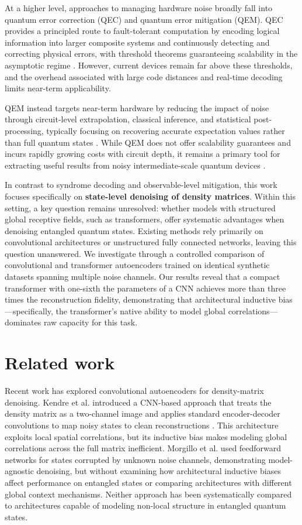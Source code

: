 \documentclass[a4paper, 11pt, colorlinks=true, citecolor=., linkcolor=black, urlcolor=black]{article}
\begin{document}
At a higher level, approaches to managing hardware noise broadly fall into quantum error correction (QEC) and quantum error mitigation (QEM). QEC provides a principled route to fault-tolerant computation by encoding logical information into larger composite systems and continuously detecting and correcting physical errors, with threshold theorems guaranteeing scalability in the asymptotic regime \autocites{Bravyi_2024}[][]{202509.2149}. However, current devices remain far above these thresholds, and the overhead associated with large code distances and real-time decoding limits near-term applicability.

QEM instead targets near-term hardware by reducing the impact of noise through circuit-level extrapolation, classical inference, and statistical post-processing, typically focusing on recovering accurate expectation values rather than full quantum states \autocites{RevModPhys.95.045005}[][]{Bultrini_2023}. While QEM does not offer scalability guarantees and incurs rapidly growing costs with circuit depth, it remains a primary tool for extracting useful results from noisy intermediate-scale quantum devices \autocite{filippov2024scalabilityquantumerrormitigation}.

In contrast to syndrome decoding and observable-level mitigation, this work focuses specifically on \textbf{state-level denoising of density matrices}. Within this setting, a key question remains unresolved: whether models with structured global receptive fields, such as transformers, offer systematic advantages when denoising entangled quantum states. Existing methods rely primarily on convolutional architectures or unstructured fully connected networks, leaving this question unanswered. We investigate through a controlled comparison of convolutional and transformer autoencoders trained on identical synthetic datasets spanning multiple noise channels. Our results reveal that a compact transformer with one-sixth the parameters of a CNN achieves more than three times the reconstruction fidelity, demonstrating that architectural inductive bias—specifically, the transformer's native ability to model global correlations—dominates raw capacity for this task.
\section{Related work}
\label{sec:orgdebafc1}
Recent work has explored convolutional autoencoders for density-matrix denoising. Kendre et al. introduced a CNN-based approach that treats the density matrix as a two-channel image and applies standard encoder-decoder convolutions to map noisy states to clean reconstructions \autocite{kendre2025machinelearningquantumnoise}. This architecture exploits local spatial correlations, but its inductive bias makes modeling global correlations across the full matrix inefficient. Morgillo et al. used feedforward networks for states corrupted by unknown noise channels, demonstrating model-agnostic denoising, but without examining how architectural inductive biases affect performance on entangled states or comparing architectures with different global context mechanisms. Neither approach has been systematically compared to architectures capable of modeling non-local structure in entangled quantum states.
\end{document}
